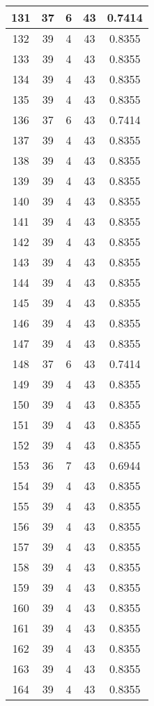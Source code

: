 \documentclass[letterpaper, 12pt]{article}
\begin{document}
\begin{longtable}{|c|c|c|c|c|}
\hline
131 & 37 & 6 & 43 & 0.7414 \\
\hline
132 & 39 & 4 & 43 & 0.8355 \\
\hline
133 & 39 & 4 & 43 & 0.8355 \\
\hline
134 & 39 & 4 & 43 & 0.8355 \\
\hline
135 & 39 & 4 & 43 & 0.8355 \\
\hline
136 & 37 & 6 & 43 & 0.7414 \\
\hline
137 & 39 & 4 & 43 & 0.8355 \\
\hline
138 & 39 & 4 & 43 & 0.8355 \\
\hline
139 & 39 & 4 & 43 & 0.8355 \\
\hline
140 & 39 & 4 & 43 & 0.8355 \\
\hline
141 & 39 & 4 & 43 & 0.8355 \\
\hline
142 & 39 & 4 & 43 & 0.8355 \\
\hline
143 & 39 & 4 & 43 & 0.8355 \\
\hline
144 & 39 & 4 & 43 & 0.8355 \\
\hline
145 & 39 & 4 & 43 & 0.8355 \\
\hline
146 & 39 & 4 & 43 & 0.8355 \\
\hline
147 & 39 & 4 & 43 & 0.8355 \\
\hline
148 & 37 & 6 & 43 & 0.7414 \\
\hline
149 & 39 & 4 & 43 & 0.8355 \\
\hline
150 & 39 & 4 & 43 & 0.8355 \\
\hline
151 & 39 & 4 & 43 & 0.8355 \\
\hline
152 & 39 & 4 & 43 & 0.8355 \\
\hline
153 & 36 & 7 & 43 & 0.6944 \\
\hline
154 & 39 & 4 & 43 & 0.8355 \\
\hline
155 & 39 & 4 & 43 & 0.8355 \\
\hline
156 & 39 & 4 & 43 & 0.8355 \\
\hline
157 & 39 & 4 & 43 & 0.8355 \\
\hline
158 & 39 & 4 & 43 & 0.8355 \\
\hline
159 & 39 & 4 & 43 & 0.8355 \\
\hline
160 & 39 & 4 & 43 & 0.8355 \\
\hline
161 & 39 & 4 & 43 & 0.8355 \\
\hline
162 & 39 & 4 & 43 & 0.8355 \\
\hline
163 & 39 & 4 & 43 & 0.8355 \\
\hline
164 & 39 & 4 & 43 & 0.8355 \\

\end{longtable}
\end{document}
